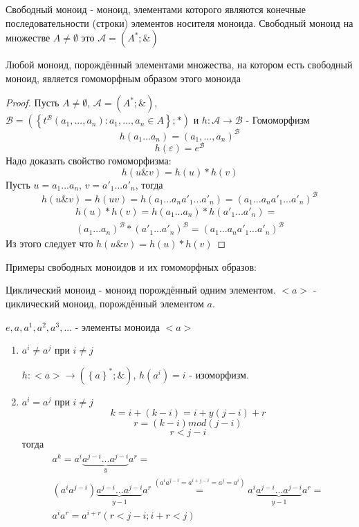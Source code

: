\documentclass[../main/document.tex]{subfiles}
\begin{document}
\begin{dfn}
Свободный моноид - моноид, элементами которого являются конечные последовательности (строки) элементов носителя моноида. Свободный моноид на множестве $A\neq \emptyset$ это $\mathcal{A}=(A^*;\&)$
\end{dfn}
\begin{thm}
Любой моноид, порождённый элементами множества, на котором есть свободный моноид, является гомоморфным образом этого моноида
\begin{proof}
Пусть $A\neq \emptyset$, $\mathcal{A}=(A^*;\&)$,\\ $\mathcal{B}=(\left\{t^{\mathcal{B}}(a_1,...,a_n): a_1,...,a_n\in A\right\};*)$ и $h:\mathcal{A}\rightarrow \mathcal{B}$ - Гомоморфизм
$$h(a_1...a_n)=(a_1,...,a_n)^{\mathcal{B}}$$
$$h(\varepsilon)=e^{\mathcal{B}}$$
Надо доказать свойство гомоморфизма:
$$h(u\&v)=h(u)*h(v)$$
Пусть $u=a_1...a_n$, $v={a'}_1...{a'}_n$, тогда
$$h(u\&v)=h(uv)=h(a_1...a_n{a'}_1...{a'}_n)=(a_1...a_n{a'}_1...{a'}_n)^{\mathcal{B}}$$
\begin{multline*}
h(u)*h(v)=h(a_1...a_n)*h({a'}_1...{a'}_n)=\\
(a_1...a_n)^{\mathcal{B}}*({a'}_1...{a'}_n)^{\mathcal{B}}=(a_1...a_n{a'}_1...{a'}_n)^{\mathcal{B}}
\end{multline*}
Из этого следует что $h(u\&v)=h(u)*h(v)$
\end{proof}
\end{thm}
\begin{exm}
Примеры свободных моноидов и их гомоморфных образов:
\end{exm}

\begin{dfn}

Циклический моноид - моноид порождённый одним элементом. $<a>$ - циклический моноид, порождённый элементом $a$.

$e,a,a^1,a^2,a^3,...$ - элементы моноида $<a>$

\begin{enumerate}
\item $a^i\neq a^j$ при $i\neq j$

$h:<a>\rightarrow ({\left\{a\right\}}^*;\&)$, $h(a^i)=i$ - изоморфизм.
\item $a^i=a^j$ при $i\neq j$
$$k=i+(k-i)=i+y(j-i)+r$$
$$r=(k-i)mod(j-i)$$
$$r<j-i$$
тогда
\begin{multline*}
a^k=a^i\underbrace{a^{j-i}...a^{j-i}}_{y}a^r=\\
(a^ia^{j-i})\underbrace{a^{j-i}...a^{j-i}}_{y-1}a^r\stackrel{(a^ia^{j-i}=a^{i+j-i}=a^j=a^i)}{=}a^i\underbrace{a^{j-i}...a^{j-i}}_{y-1}a^r=\\
a^ia^r=a^{i+r} (r<j-i; i+r<j)
\end{multline*}
\end{enumerate}
\end{dfn} %
\end{document}
